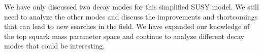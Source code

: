 We have only discussed two decay modes for this simplified SUSY model. We still need to analyze the other modes and discuss the improvements and shortcomings that can lead to new searches in the field. We have expanded our knowledge of the top squark mass parameter space and continue to analyze different decay modes that could be interesting.
